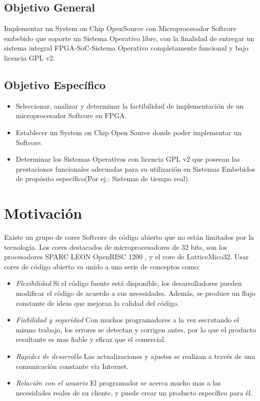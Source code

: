 \subsection{Objetivo General}

Implementar un System on Chip OpenSource con Microprocesador Softcore embebido que soporte un Sistema Operativo libre, con la finalidad de entregar
un sistema integral FPGA-SoC-Sistema Operativo completamente funcional y bajo licencia GPL v2. %

\subsection{Objetivo Específico}
\begin{itemize}
\item Seleccionar, analizar y determinar la factibilidad de implementación de un microprocesador Softcore en FPGA.
\item Establecer un System on Chip Open Source donde poder implementar un Softcore.
\item Determinar los Sistemas Operativos con licencia GPL v2 que poseean las prestaciones funcionales adecuadas para su utilización en Sistemas
Embebidos de propósito específico(Por ej.: Sistemas de tiempo real).
\end{itemize}

\section{Motivación} 

Existe un grupo de cores Softcore de código abierto que no están limitados por la tecnología. Los cores destacados de microprocesadores de 32 bits,
son los procesadores SPARC LEON OpenRISC 1200 , y el core de LatticeMico32. Usar cores de código abierto va unido a una serie de conceptos como:
\begin {itemize}
\item
\textit{Flexibilidad}  Si el código fuente está disponible, los desarrolladores pueden modificar el código de acuerdo a sus necesidades. Además, se
produce un flujo constante de ideas que mejoran la calidad del código.
\item 
\textit{Fiabilidad y seguridad}  Con muchos programadores a la vez escrutando el mismo trabajo, los errores se detectan y corrigen antes, por lo que
el producto resultante es mas fiable y eficaz que el comercial.
\item 
\textit{Rapidez de desarrollo}  Las actualizaciones y ajustes se realizan a través de una comunicación constante vía Internet.
\item 
\textit{Relación con el usuario} El programador se acerca mucho mas a las necesidades reales de su cliente, y puede crear un producto específico para
él.
 \end {itemize}
 
